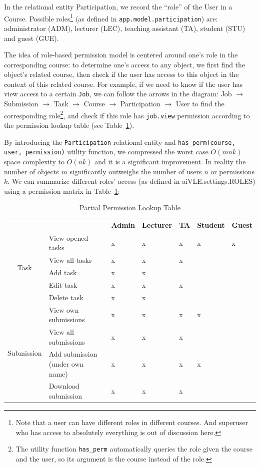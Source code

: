 In the relational entity Participation, we record the ``role'' of the User in a Course. Possible roles\footnote{Note that a user can have different roles in different courses. And superuser who has access to absolutely everything is out of discussion here.} (as defined in \texttt{app.model.participation}) are: administrator (ADM), lecturer (LEC), teaching assistant (TA), student (STU) and guest (GUE).

The idea of role-based permission model is centered around one's role in the corresponding course: to determine one's access to any object, we first find the object's related course, then check if the user has access to this object in the context of this related course. For example, if we need to know if the user has view access to a certain \texttt{Job}, we can follow the arrows in the diagram: Job $\to$ Submission $\to$ Task $\to$ Course $\to$ Participation $\to$ User to find the corresponding role\footnote{The utility function \texttt{has\_perm} automatically queries the role given the course and the user, so its argument is the course instead of the role.}, and check if this role has \texttt{job.view} permission according to the permission lookup table (see Table~\ref{tab:aivle-web-permission-table}).

By introducing the \texttt{Participation} relational entity and \texttt{has\_perm(course, user, permission)} utility function, we compressed the worst case $O(mnk)$ space complexity to $O(nk)$ and it is a significant improvement. In reality the number of objects $m$ significantly outweighs the number of users $n$ or permissions $k$. We can summarize different roles' access (as defined in aiVLE.settings.ROLES) using a permission matrix in Table~\ref{tab:aivle-web-permission-table}:

\begin{table}[H]
\centering
\begin{tabular}{|c|l|l|l|l|l|l|}
\hline
\multicolumn{1}{|l|}{} &  & Admin & Lecturer & TA & Student & Guest \\ \hline
\multirow{5}{*}{Task} & View opened tasks & x & x & x & x & x \\ \cline{2-7} 
 & View all tasks & x & x & x &  &  \\ \cline{2-7} 
 & Add task & x & x &  &  &  \\ \cline{2-7} 
 & Edit task & x & x & x &  &  \\ \cline{2-7} 
 & Delete task & x & x &  &  &  \\ \hline
\multirow{4}{*}{Submission} & View own submissions & x & x & x & x &  \\ \cline{2-7} 
 & View all submissions & x & x & x &  &  \\ \cline{2-7} 
 & Add submission (under own name) & x & x & x & x &  \\ \cline{2-7} 
 & Download submission & x & x & x &  &  \\ \hline
\end{tabular}
\caption{Partial Permission Lookup Table}
\label{tab:aivle-web-permission-table}
\end{table}

